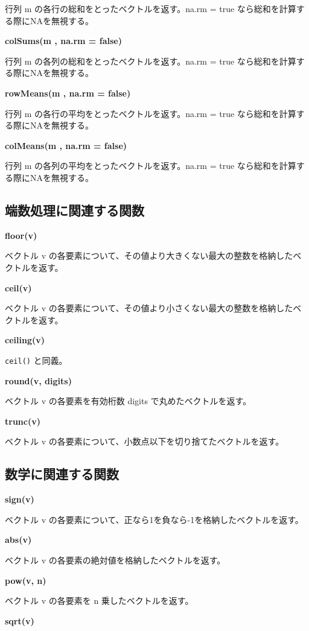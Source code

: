 \documentclass[]{book}
\begin{document}
行列 m の各行の総和をとったベクトルを返す。na.rm = true なら総和を計算する際にNAを無視する。

\textbf{colSums(m , na.rm = false)}

行列 m の各列の総和をとったベクトルを返す。na.rm = true なら総和を計算する際にNAを無視する。

\textbf{rowMeans(m , na.rm = false)}

行列 m の各行の平均をとったベクトルを返す。na.rm = true なら総和を計算する際にNAを無視する。

\textbf{colMeans(m , na.rm = false)}

行列 m の各列の平均をとったベクトルを返す。na.rm = true なら総和を計算する際にNAを無視する。

\subsection{端数処理に関連する関数}

\textbf{floor(v)}

ベクトル v の各要素について、その値より大きくない最大の整数を格納したベクトルを返す。

\textbf{ceil(v)}

ベクトル v の各要素について、その値より小さくない最大の整数を格納したベクトルを返す。

\textbf{ceiling(v)}

\texttt{ceil()} と同義。

\textbf{round(v, digits)}

ベクトル v の各要素を有効桁数 digits で丸めたベクトルを返す。

\textbf{trunc(v)}

ベクトル v の各要素について、小数点以下を切り捨てたベクトルを返す。

\subsection{数学に関連する関数}

\textbf{sign(v)}

ベクトル v の各要素について、正なら1を負なら-1を格納したベクトルを返す。

\textbf{abs(v)}

ベクトル v の各要素の絶対値を格納したベクトルを返す。

\textbf{pow(v, n)}

ベクトル v の各要素を n 乗したベクトルを返す。

\textbf{sqrt(v)}
\end{document}
